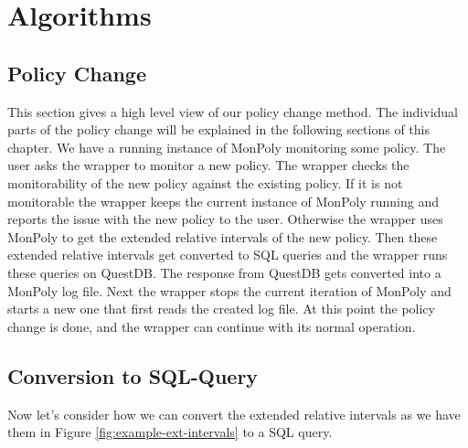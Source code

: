 \chapter{Algorithms}

\section{Policy Change}
This section gives a high level view of our policy change method.
The individual parts of the policy change will be explained in the following sections of this chapter.
We have a running instance of MonPoly monitoring some policy.
The user asks the wrapper to monitor a new policy.
The wrapper checks the monitorability of the new policy against the existing policy.
If it is not monitorable the wrapper keeps the current instance of MonPoly running and reports the issue with the new policy to the user.
Otherwise the wrapper uses MonPoly to get the extended relative intervals of the new policy.
Then these extended relative intervals get converted to SQL queries and the wrapper runs these queries on QuestDB.
The response from QuestDB gets converted into a MonPoly log file.
Next the wrapper stops the current iteration of MonPoly and starts a new one that first reads the created log file.
At this point the policy change is done, and the wrapper can continue with its normal operation.







\section{Conversion to SQL-Query}
Now let's consider how we can convert the extended relative intervals as we have them in Figure \ref{fig:example-ext-intervals} to a SQL query.





